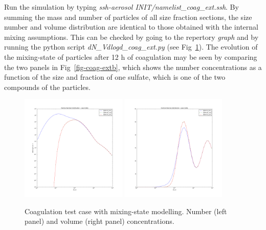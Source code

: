\documentclass[a4paper,11pt]{article}
\begin{document}
Run the simulation by typing {\it{ssh-aerosol INIT/namelist\_coag\_ext.ssh}}.
By summing the mass and number of particles of all size fraction sections, the
size number and volume distribution are identical to those obtained with the
internal mixing assumptions. This can be checked by going to the repertory
{\it{graph}} and by running the python script {\it{dN\_Vdlogd\_coag\_ext.py}}
(see Fig~\ref{fig-coag-ext}).
The evolution of the mixing-state of particles after 12 h of coagulation may
be seen by comparing the two panels in Fig~\ref{fig-coag-extb}, which shows
the number concentrations as a function of the size and fraction of one
sulfate, which is one of the
two compounds of the particles.

\begin{figure}[H]
        \begin{center}
                \includegraphics[angle=0,width=0.45\textwidth]{../graph/figure_ref/dNdlogd_COAG_EXT.png}
                \includegraphics[angle=0,width=0.45\textwidth]{../graph/figure_ref/dVdlogd_COAG_EXT.png}
        \end{center}
\caption{Coagulation test case with mixing-state modelling. Number (left panel) and volume (right panel) concentrations.}
\label{fig-coag-ext}
\end{figure}
 
\end{document}
